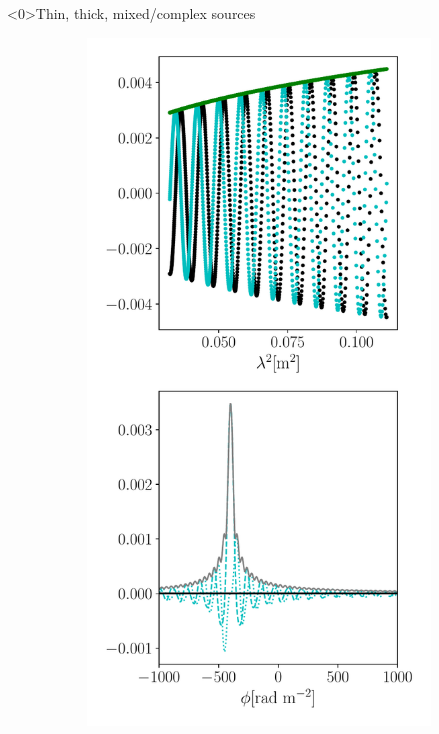 \documentclass[xetex,aspectratio=169]{beamer}
\begin{document}
\begin{frame}<0>{Thin, thick, mixed/complex sources}

	\begin{figure}
		\centering

		\begin{subfigure}{0.2\textwidth}
			\includegraphics[width=\textwidth]{figures/sources/thin_source.pdf}

\end{subfigure}
\end{figure}
\end{frame}
\end{document}
